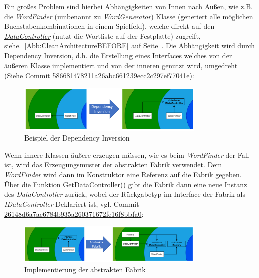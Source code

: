 Ein großes Problem sind hierbei Abhängigkeiten von Innen nach Außen, wie z.B. die \href{https://github.com/EinToni/Wortfinder/blob/main/Wortfinder/WordGenerator.cs}{\textit{WordFinder}} (umbenannt zu \textit{WordGenerator}) Klasse (generiert alle möglichen Buchstabenkombinationen in einem Spielfeld), welche direkt auf den \href{https://github.com/EinToni/Wortfinder/blob/586681478211a26abc661239ecc2c297ef77041e/Wortfinder/DataController.cs}{\textit{DataController}} (nutzt die Wortliste auf der Festplatte) zugreift, siehe.~\ref{Abb:CleanArchitectureBEFORE} auf Seite~\pageref{Abb:CleanArchitectureBEFORE}. Die Abhängigkeit wird durch Dependency Inversion, d.h. die Erstellung eines Interfaces welches von der äußeren Klasse implementiert und von der inneren genutzt wird, umgedreht (Siehe Commit \href{https://github.com/EinToni/Wortfinder/commit/586681478211a26abc661239ecc2c297ef77041e}{586681478211a26abc661239ecc2c297ef77041e}):
\newpage
\begin{figure}[!ht]
  \centering
  \includegraphics[width=0.8\textwidth]{Bilder/DependencyInversion.PNG}
  \caption{Beispiel der Dependency Inversion}
  \label{Abb:DependencyInversion}
\end{figure}

Wenn innere Klassen äußere erzeugen müssen, wie es beim \textit{WordFinder} der Fall ist, wird das Erzeugungsmuster der abstrakten Fabrik verwendet. Dem \textit{WordFinder} wird dann im Konstruktor eine Referenz auf die Fabrik gegeben. Über die Funktion \glqq GetDataController()\grqq{} gibt die Fabrik dann eine neue Instanz des \textit{DataController} zurück, wobei der Rückgabetyp im Interface der Fabrik als \textit{IDataController} Deklariert ist, vgl. Commit \href{https://github.com/EinToni/Wortfinder/commit/26148d6a7ae6784b935a260371672fe16f8bbfa0}{26148d6a7ae6784b935a260371672fe16f8bbfa0}:

\begin{figure}[!ht]
  \centering
  \includegraphics[width=0.8\textwidth]{Bilder/AbstrakteFabrik.PNG}
  \caption{Implementierung der abstrakten Fabrik}
  \label{Abb:AbstrakteFabrik}
\end{figure}

